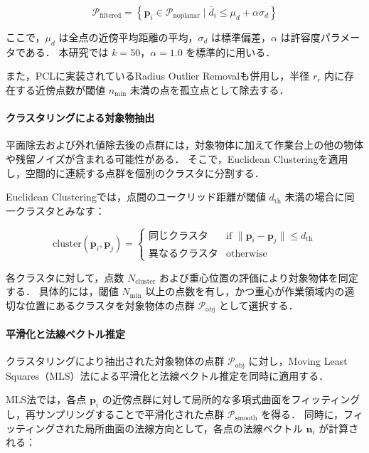 \begin{equation}
  \mathcal{P}_{\mathrm{filtered}} = \left\{ \bm{p}_i \in \mathcal{P}_{\mathrm{noplanar}} \;|\; \bar{d}_i \leq \mu_d + \alpha \sigma_d \right\}
\end{equation}

ここで，$\mu_d$ は全点の近傍平均距離の平均，$\sigma_d$ は標準偏差，$\alpha$ は許容度パラメータである．
本研究では $k = 50$，$\alpha = 1.0$ を標準的に用いる．

また，PCLに実装されているRadius Outlier Removal\cite{PCL-method}も併用し，半径 $r_r$ 内に存在する近傍点数が閾値 $n_{\min}$ 未満の点を孤立点として除去する．

\paragraph{クラスタリングによる対象物抽出}

平面除去および外れ値除去後の点群には，対象物体に加えて作業台上の他の物体や残留ノイズが含まれる可能性がある．
そこで，Euclidean Clustering\cite{PCL-method}を適用し，空間的に連続する点群を個別のクラスタに分割する．

Euclidean Clusteringでは，点間のユークリッド距離が閾値 $d_{\mathrm{th}}$ 未満の場合に同一クラスタとみなす：

\begin{equation}
  \mathrm{cluster}(\bm{p}_i, \bm{p}_j) = \begin{cases}
    \text{同じクラスタ} & \text{if } \|\bm{p}_i - \bm{p}_j\| \leq d_{\mathrm{th}} \\
    \text{異なるクラスタ} & \text{otherwise}
  \end{cases}
\end{equation}

各クラスタに対して，点数 $N_{\mathrm{cluster}}$ および重心位置の評価により対象物体を同定する．
具体的には，閾値 $N_{\min}$ 以上の点数を有し，かつ重心が作業領域内の適切な位置にあるクラスタを対象物体の点群 $\mathcal{P}_{\mathrm{obj}}$ として選択する．

\paragraph{平滑化と法線ベクトル推定}

クラスタリングにより抽出された対象物体の点群 $\mathcal{P}_{\mathrm{obj}}$ に対し，Moving Least Squares（MLS）法\cite{PCL-MLS}による平滑化と法線ベクトル推定を同時に適用する．

MLS法では，各点 $\bm{p}_i$ の近傍点群に対して局所的な多項式曲面をフィッティングし，再サンプリングすることで平滑化された点群 $\mathcal{P}_{\mathrm{smooth}}$ を得る．
同時に，フィッティングされた局所曲面の法線方向として，各点の法線ベクトル $\bm{n}_i$ が計算される：

